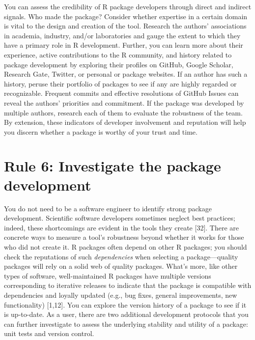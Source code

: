 \documentclass[10pt,letterpaper]{article}
\begin{document}
You can assess the credibility of R package developers through direct
and indirect signals. Who made the package? Consider whether expertise
in a certain domain is vital to the design and creation of the tool.
Research the authors' associations in academia, industry, and/or
laboratories and gauge the extent to which they have a primary role in R
development. Further, you can learn more about their experience, active
contributions to the R community, and history related to package
development by exploring their profiles on GitHub, Google Scholar,
Research Gate, Twitter, or personal or package websites. If an author
has such a history, peruse their portfolio of packages to see if any are
highly regarded or recognizable. Frequent commits and effective
resolutions of GitHub Issues can reveal the authors' priorities and
commitment. If the package was developed by multiple authors, research
each of them to evaluate the robustness of the team. By extension, these
indicators of developer involvement and reputation will help you discern
whether a package is worthy of your trust and time.

\hypertarget{rule-6-investigate-the-package-development}{%
\section{Rule 6: Investigate the package
development}\label{rule-6-investigate-the-package-development}}

You do not need to be a software engineer to identify strong package
development. Scientific software developers sometimes neglect best
practices; indeed, these shortcomings are evident in the tools they
create {[}32{]}. There are concrete ways to measure a tool's robustness
beyond whether it works for those who did not create it. R packages
often depend on other R packages; you should check the reputations of
such \emph{dependencies} when selecting a package---quality packages
will rely on a solid web of quality packages. What's more, like other
types of software, well-maintained R packages have multiple versions
corresponding to iterative releases to indicate that the package is
compatible with dependencies and loyally updated (e.g., bug fixes,
general improvements, new functionality) {[}1,12{]}. You can explore the
version history of a package to see if it is up-to-date. As a user,
there are two additional development protocols that you can further
investigate to assess the underlying stability and utility of a package:
unit tests and version control.
\end{document}
